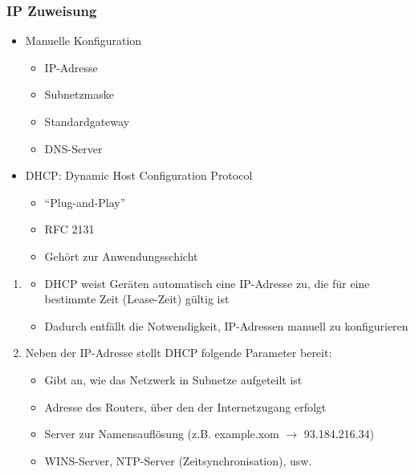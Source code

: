 \subsubsection*{IP Zuweisung}
\begin{itemize}
    \item Manuelle Konfiguration
    \begin{itemize}
        \item IP-Adresse
        \item Subnetzmaske
        \item Standardgateway
        \item DNS-Server
    \end{itemize}
    \item DHCP: Dynamic Host Configuration Protocol
    \begin{itemize}
        \item \enquote{Plug-and-Play}
        \item RFC 2131
        \item Gehört zur Anwendungsschicht
    \end{itemize}
\end{itemize}
\begin{infoBox}[title=Grundfunktion von DHCP]
    \begin{enumerate}
        \item {}
        \begin{itemize}
            \item DHCP weist Geräten automatisch eine IP-Adresse zu, die für eine bestimmte Zeit (Lease-Zeit) gültig ist
            \item Dadurch entfällt die Notwendigkeit, IP-Adressen manuell zu konfigurieren
        \end{itemize}
        \item {}
        Neben der IP-Adresse stellt DHCP folgende Parameter bereit:
        \begin{itemize}
            \item {} Gibt an, wie das Netzwerk in Subnetze aufgeteilt ist
            \item {} Adresse des Routers, über den der Internetzugang erfolgt
            \item {} Server zur Namensauflösung (z.B. example.xom $\rightarrow$ 93.184.216.34)
            \item {} WINS-Server, NTP-Server (Zeitsynchronisation), usw.
        \end{itemize}
    \end{enumerate}
\end{infoBox}
